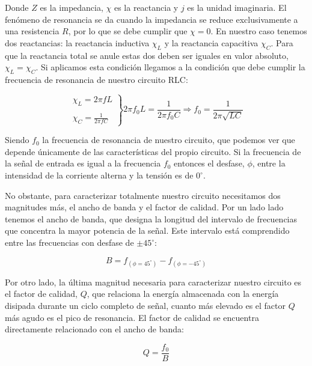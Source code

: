 \documentclass[a4paper,12pt,titlepage]{article}
\begin{document}
Donde $Z$ es la impedancia, $\chi$ es la reactancia y $j$ es la unidad imaginaria. El fenómeno de resonancia se da cuando la impedancia se reduce exclusivamente a una resistencia $R$, por lo que se debe cumplir que $\chi=0$. En nuestro caso tenemos dos reactancias: la reactancia inductiva $\chi_L$ y la reactancia capacitiva $\chi_C$. Para que la reactancia total se anule estas dos deben ser iguales en valor absoluto, $\chi_L=\chi_C$. Si aplicamos esta condición llegamos a la condición que debe cumplir la frecuencia de resonancia de nuestro circuito RLC:

\begin{equation}
    \left.\begin{array}{c}
    \chi_L = 2\pi f L   \\ \\
    \chi_C = \frac{1}{2\pi f C}
    \end{array} \right\}
    2\pi f_0 L = \frac{1}{2\pi f_0C} \Rightarrow f_0 = \frac{1}{2\pi \sqrt{LC}}
    \label{f0}
\end{equation}

Siendo $f_0$ la frecuencia de resonancia de nuestro circuito, que podemos ver que depende únicamente de las características del propio circuito. Si la frecuencia de la señal de entrada es igual a la frecuencia $f_0$ entonces el desfase, $\phi$, entre la intensidad de la corriente alterna y la tensión es de $0^{\circ}$.

No obstante, para caracterizar totalmente nuestro circuito necesitamos dos magnitudes más, el ancho de banda y el factor de calidad. Por un lado lado tenemos el ancho de banda, que designa la longitud del intervalo de frecuencias que concentra la mayor potencia de la señal. Este intervalo está comprendido entre las frecuencias con desfase de $\pm 45^{\circ}$:

\begin{equation}
    B = f_{(\phi=45^{\circ})} - f_{(\phi=-45^{\circ})}
    \label{band_w}
\end{equation}

\newpage

Por otro lado, la última magnitud necesaria para caracterizar nuestro circuito es el factor de calidad, $Q$, que relaciona la energía almacenada con la energía disipada durante un ciclo completo de señal, cuanto más elevado es el factor $Q$ más agudo es el pico de resonancia. El factor de calidad se encuentra directamente relacionado con el ancho de banda:

\begin{equation}
    Q = \frac{f_0}{B}
    \label{q_factor}
\end{equation}
\end{document}
